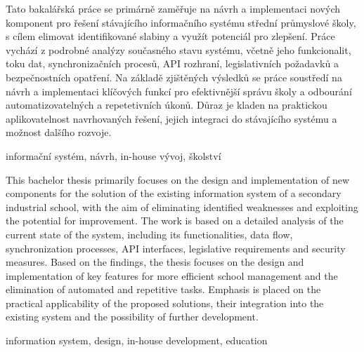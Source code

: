 \begin{abstractCZ}
    Tato bakalářská práce se primárně zaměřuje na návrh a implementaci nových komponent pro řešení stávajícího informačního systému střední průmyslové školy, s cílem elimovat identifikované slabiny a využít potenciál pro zlepšení. Práce vychází z podrobné analýzy současného stavu systému, včetně jeho funkcionalit, toku dat, synchronizačních procesů, API rozhraní, legislativních požadavků a bezpečnostních opatření. Na základě zjištěných výsledků se práce soustředí na návrh a implementaci klíčových funkcí pro efektivnější správu školy a odbourání automatizovatelných a repetetivních úkonů. Důraz je kladen na praktickou aplikovatelnost navrhovaných řešení, jejich integraci do stávajícího systému a možnost dalšího rozvoje.
\end{abstractCZ}

\begin{keywordsCZ}
    informační systém, návrh, in-house vývoj, školství
\end{keywordsCZ}
    
    \vspace{2cm}
    
\begin{abstractEN}
    This bachelor thesis primarily focuses on the design and implementation of new components for the solution of the existing information system of a secondary industrial school, with the aim of eliminating identified weaknesses and exploiting the potential for improvement. The work is based on a detailed analysis of the current state of the system, including its functionalities, data flow, synchronization processes, API interfaces, legislative requirements and security measures. Based on the findings, the thesis focuses on the design and implementation of key features for more efficient school management and the elimination of automated and repetitive tasks. Emphasis is placed on the practical applicability of the proposed solutions, their integration into the existing system and the possibility of further development.
\end{abstractEN}
    
\begin{keywordsEN}
    information system, design, in-house development, education
\end{keywordsEN}
